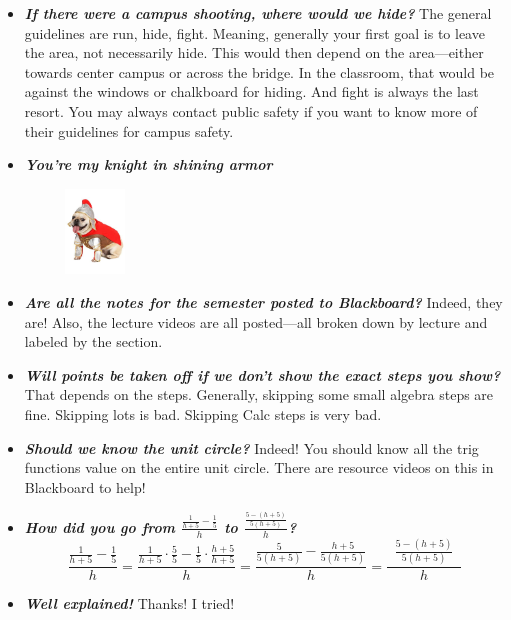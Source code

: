 \documentclass[11pt,letterpaper]{article}
\begin{document}
\begin{itemize}
\item {\bfseries\itshape If there were a campus shooting, where would we hide?} The general guidelines are run, hide, fight. Meaning, generally your first goal is to leave the area, not necessarily hide. This would then depend on the area---either towards center campus or across the bridge. In the classroom, that would be against the windows or chalkboard for hiding. And fight is always the last resort. You may always contact public safety if you want to know more of their guidelines for campus safety. 

\item {\bfseries\itshape You're my knight in shining armor} 
	\begin{figure}[H]
	\centering
	\includegraphics[width=0.15\textwidth]{images/pugcostume}
	\end{figure}

\item {\bfseries\itshape Are all the notes for the semester posted to Blackboard?} Indeed, they are! Also, the lecture videos are all posted---all broken down by lecture and labeled by the section.

\item {\bfseries\itshape Will points be taken off if we don't show the exact steps you show?} That depends on the steps. Generally, skipping some small algebra steps are fine. Skipping lots is bad. Skipping Calc steps is very bad. 

\item {\bfseries\itshape Should we know the unit circle?} Indeed! You should know all the trig functions value on the entire unit circle. There are resource videos on this in Blackboard to help!

\item {\bfseries\itshape How did you go from $\tfrac{\frac{1}{h + 5} - \frac{1}{5}}{h}$ to $\tfrac{\tfrac{5 - (h + 5)}{5(h + 5)}}{h}$?}
	\[
	\dfrac{\frac{1}{h + 5} - \frac{1}{5}}{h}= \dfrac{\frac{1}{h + 5} \cdot \frac{5}{5} - \frac{1}{5} \cdot \frac{h + 5}{h + 5}}{h}= \dfrac{\frac{5}{5(h + 5)} - \frac{h+5}{5(h + 5)}}{h}= \dfrac{\;\;\frac{5 - (h + 5)}{5(h + 5)}\;\;}{h}
	\]

\item {\bfseries\itshape Well explained!} Thanks! I tried!


\end{itemize}
\end{document}
